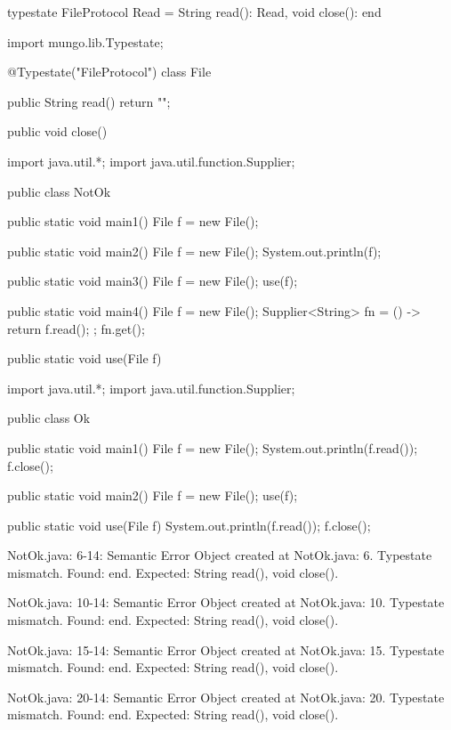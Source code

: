 \begin{code}
typestate FileProtocol {
  Read = {
    String read(): Read,
    void close(): end
  }
}\end{code}

\begin{code}
import mungo.lib.Typestate;

@Typestate("FileProtocol")
class File {

  public String read() {
    return "";
  }

  public void close() {
  }

}\end{code}

\begin{code}
import java.util.*;
import java.util.function.Supplier;

public class NotOk {
  public static void main1() {
    File f = new File();
  }

  public static void main2() {
    File f = new File();
    System.out.println(f);
  }

  public static void main3() {
    File f = new File();
    use(f);
  }

  public static void main4() {
    File f = new File();
    Supplier<String> fn = () -> {
      return f.read();
    };
    fn.get();
  }

  public static void use(File f) {

  }
}\end{code}

\begin{code}
import java.util.*;
import java.util.function.Supplier;

public class Ok {
  public static void main1() {
    File f = new File();
    System.out.println(f.read());
    f.close();
  }

  public static void main2() {
    File f = new File();
    use(f);
  }

  public static void use(File f) {
    System.out.println(f.read());
    f.close();
  }
}\end{code}

\lstset{language=,caption=Original Mungo output}
\begin{code}

NotOk.java: 6-14: Semantic Error
		Object created at NotOk.java: 6. Typestate mismatch. Found: end. Expected: String read(), void close().

NotOk.java: 10-14: Semantic Error
		Object created at NotOk.java: 10. Typestate mismatch. Found: end. Expected: String read(), void close().

NotOk.java: 15-14: Semantic Error
		Object created at NotOk.java: 15. Typestate mismatch. Found: end. Expected: String read(), void close().

NotOk.java: 20-14: Semantic Error
		Object created at NotOk.java: 20. Typestate mismatch. Found: end. Expected: String read(), void close().
\end{code}

